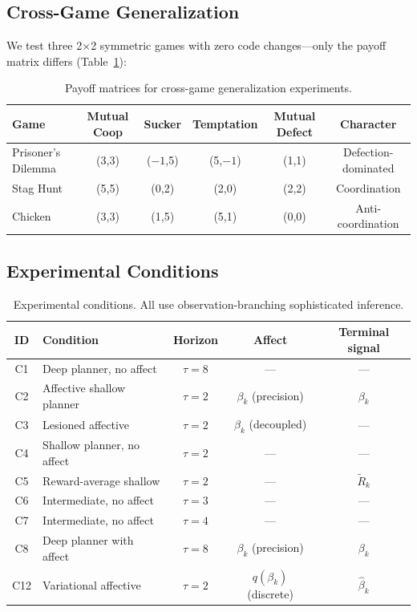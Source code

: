 \documentclass[11pt,a4paper]{article}
\begin{document}
\subsection{Cross-Game Generalization}

We test three 2$\times$2 symmetric games with zero code changes---only the payoff matrix differs (Table~\ref{tab:payoffs}):

\begin{table}[ht]
\centering\small
\begin{tabular}{lccccc}
\toprule
Game & Mutual Coop & Sucker & Temptation & Mutual Defect & Character \\
\midrule
Prisoner's Dilemma & (3,3) & ($-1$,5) & (5,$-1$) & (1,1) & Defection-dominated \\
Stag Hunt & (5,5) & (0,2) & (2,0) & (2,2) & Coordination \\
Chicken & (3,3) & (1,5) & (5,1) & (0,0) & Anti-coordination \\
\bottomrule
\end{tabular}
\caption{Payoff matrices for cross-game generalization experiments.}
\label{tab:payoffs}
\end{table}

\subsection{Experimental Conditions}

\begin{table}[ht]
\centering\small
\begin{tabular}{clccc}
\toprule
ID & Condition & Horizon & Affect & Terminal signal \\
\midrule
C1 & Deep planner, no affect & $\tau=8$ & --- & --- \\
C2 & Affective shallow planner & $\tau=2$ & $\beta_k$ (precision) & $\beta_k$ \\
C3 & Lesioned affective & $\tau=2$ & $\beta_k$ (decoupled) & --- \\
C4 & Shallow planner, no affect & $\tau=2$ & --- & --- \\
C5 & Reward-average shallow & $\tau=2$ & --- & $\tilde{R}_k$ \\
C6 & Intermediate, no affect & $\tau=3$ & --- & --- \\
C7 & Intermediate, no affect & $\tau=4$ & --- & --- \\
C8 & Deep planner with affect & $\tau=8$ & $\beta_k$ (precision) & $\beta_k$ \\
C12 & Variational affective & $\tau=2$ & $q(\beta_k)$ (discrete) & $\hat{\beta}_k$ \\
\bottomrule
\end{tabular}
\caption{Experimental conditions. All use observation-branching sophisticated inference.}
\label{tab:conditions}
\end{table}
\end{document}

